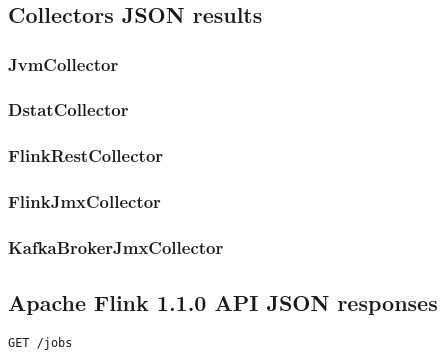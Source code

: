 \appendix

\chapter{}

\section{Collectors JSON results}
\subsection{JvmCollector}
\subsection{DstatCollector}
\label{subsec:dstat-result}
\subsection{FlinkRestCollector}
\subsection{FlinkJmxCollector}
\subsection{KafkaBrokerJmxCollector}

\section{Apache Flink 1.1.0 API JSON responses}
\verb|GET /jobs|

